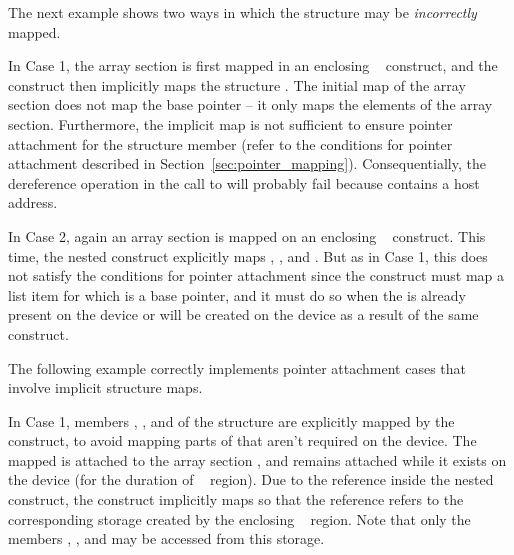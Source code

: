 
The next example shows two ways in which the structure may be
\emph{incorrectly} mapped.

In Case 1, the array section  is first mapped in an enclosing
~ construct, and the  construct then
implicitly maps the structure . The initial map of the array section
does not map the base pointer  -- it only maps the elements of the
array section.  Furthermore, the implicit map is not sufficient to ensure
pointer attachment for the structure member  (refer to the conditions
for pointer attachment described in Section~\ref{sec:pointer_mapping}).
Consequentially, the dereference operation  in the call to
 will probably fail because  contains a host address.

In Case 2, again an array section is mapped on an enclosing
~ construct. This time, the nested 
construct explicitly maps , , and . But as in
Case 1, this does not satisfy the conditions for pointer attachment since the
construct must map a list item for which  is a base pointer, and it
must do so when the  is already present on the device or will be
created on the device as a result of the same construct.

 


The following example correctly implements pointer attachment cases that
involve implicit structure maps.

In Case 1, members , , and  of the structure 
are explicitly mapped by the ~ construct, to avoid
mapping parts of  that aren't required on the device. The mapped
 is attached to the array section , and remains
attached while it exists on the device (for the duration of
~ region).  Due to the  reference inside the
nested  construct, the construct implicitly maps  so that
the reference refers to the corresponding storage created by the enclosing
~ region. Note that only the members ,
, and  may be accessed from this storage.

